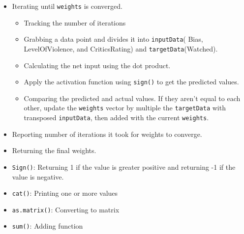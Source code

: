 \documentclass[
]{article}
\providecommand{\tightlist}{%
  \setlength{\itemsep}{0pt}\setlength{\parskip}{0pt}}
\begin{document}
\begin{itemize}
\item
  Iterating until \texttt{weights} is converged.

  \begin{itemize}
  \tightlist
  \item
    Tracking the number of iterations
  \item
    Grabbing a data point and divides it into \texttt{inputData}( Bias,
    LevelOfViolence, and CriticsRating) and
    \texttt{targetData}(Watched).
  \item
    Calculating the net input using the dot product.
  \item
    Apply the activation function using \texttt{sign()} to get the
    predicted values.
  \item
    Comparing the predicted and actual values. If they aren't equal to
    each other, update the \texttt{weights} vector by multiple the
    \texttt{targetData} with transposed \texttt{inputData}, then added
    with the current \texttt{weights}.
  \end{itemize}
\item
  Reporting number of iterations it took for weights to converge.
\item
  Returning the final weights.
\item
  \texttt{Sign()}: Returning 1 if the value is greater positive and
  returning -1 if the value is negative.
\item
  \texttt{cat()}: Printing one or more values
\item
  \texttt{as.matrix()}: Converting to matrix
\item
  \texttt{sum()}: Adding function
\end{itemize}
\end{document}
